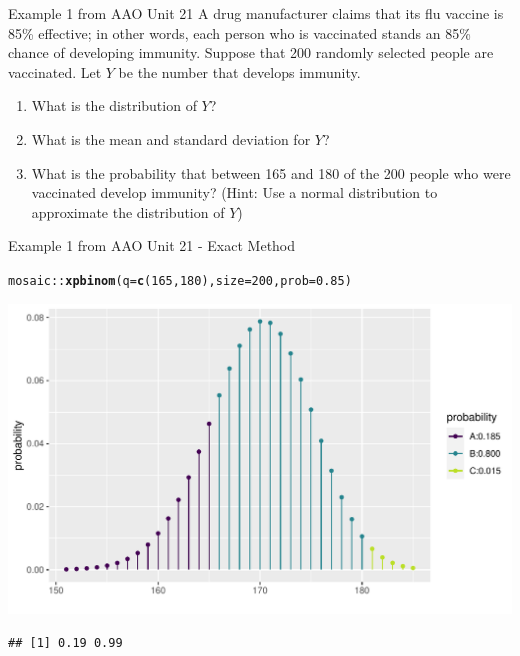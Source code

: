 \documentclass[10pt]{beamer}\usepackage[]{graphicx}\usepackage[]{color}
\makeatletter
\def\maxwidth{ %
  \ifdim\Gin@nat@width>\linewidth
    \linewidth
  \else
    \Gin@nat@width
  \fi
}
\newcommand{\hlnum}[1]{\textcolor[rgb]{0.686,0.059,0.569}{#1}}%
\newcommand{\hlopt}[1]{\textcolor[rgb]{0,0,0}{#1}}%
\newcommand{\hlstd}[1]{\textcolor[rgb]{0.345,0.345,0.345}{#1}}%
\newcommand{\hlkwc}[1]{\textcolor[rgb]{0.333,0.667,0.333}{#1}}%
\newcommand{\hlkwd}[1]{\textcolor[rgb]{0.737,0.353,0.396}{\textbf{#1}}}%
\newenvironment{kframe}{%
 \def\at@end@of@kframe{}%
 \ifinner\ifhmode%
  \def\at@end@of@kframe{\end{minipage}}%
  \begin{minipage}{\columnwidth}%
 \fi\fi%
 \def\FrameCommand##1{\hskip\@totalleftmargin \hskip-\fboxsep
 \colorbox{shadecolor}{##1}\hskip-\fboxsep
     \hskip-\linewidth \hskip-\@totalleftmargin \hskip\columnwidth}%
 \MakeFramed {\advance\hsize-\width
   \@totalleftmargin\z@ \linewidth\hsize
   \@setminipage}}%
 {\par\unskip\endMakeFramed%
 \at@end@of@kframe}
\newenvironment{knitrout}{}{} %
\makeatother
\begin{document}
\begin{frame}{Example 1 from AAO Unit 21}
	A drug manufacturer claims that its flu vaccine is 85\% effective; in other words, each person who is vaccinated stands an 85\% chance of developing immunity. Suppose that 200 randomly selected people are vaccinated. Let $Y$ be the number that develops immunity.
	
	\begin{enumerate}
		\item What is the distribution of $Y$?
		\item What is the mean and standard deviation for $Y$?
		\item What is the probability that between 165 and 180 of the 200 people who were vaccinated
		develop immunity? (Hint: Use a normal distribution to approximate the distribution of $Y$)
	\end{enumerate}
\end{frame}


\begin{frame}[fragile]{Example 1 from AAO Unit 21 - Exact Method}
	
\begin{knitrout}\tiny
{}\color{fgcolor}\begin{kframe}
\begin{alltt}
\hlstd{mosaic}\hlopt{::}\hlkwd{xpbinom}\hlstd{(}\hlkwc{q} \hlstd{=} \hlkwd{c}\hlstd{(}\hlnum{165}\hlstd{,} \hlnum{180}\hlstd{),} \hlkwc{size} \hlstd{=} \hlnum{200}\hlstd{,} \hlkwc{prob} \hlstd{=} \hlnum{0.85}\hlstd{)}
\end{alltt}
\end{kframe}

{\centering \includegraphics[width=\maxwidth]{figure/unnamed-chunk-7-1} 

}


\begin{kframe}\begin{verbatim}
## [1] 0.19 0.99
\end{verbatim}
\end{kframe}
\end{knitrout}
\end{frame}
\end{document}
